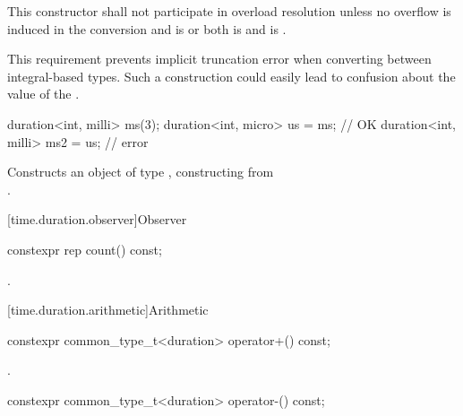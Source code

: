 \begin{itemdescr}
\pnum
\remarks
This constructor shall not participate in overload resolution unless
no overflow is induced in the conversion and
 is  or both
 is  and
 is .
\begin{note}
This
requirement prevents implicit truncation error when converting between
integral-based  types. Such a construction could easily lead to
confusion about the value of the .
\end{note}
\begin{example}
\begin{codeblock}
duration<int, milli> ms(3);
duration<int, micro> us = ms;       // OK
duration<int, milli> ms2 = us;      // error
\end{codeblock}
\end{example}

\pnum
\effects
Constructs an object of type , constructing  from\\
.
\end{itemdescr}

[time.duration.observer]{Observer}

%
\begin{itemdecl}
constexpr rep count() const;
\end{itemdecl}

\begin{itemdescr}
\pnum
\returns
{}.
\end{itemdescr}

[time.duration.arithmetic]{Arithmetic}

%
\begin{itemdecl}
constexpr common_type_t<duration> operator+() const;
\end{itemdecl}

\begin{itemdescr}
\pnum
\returns
{}.
\end{itemdescr}

%
\begin{itemdecl}
constexpr common_type_t<duration> operator-() const;
\end{itemdecl}

